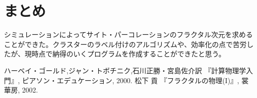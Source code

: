\documentclass{jsarticle}
\begin{document}
\begin{enumerate}
\begin{enumerate}
\begin{figure}[H]
                    \end{figure}
                    
                \end{enumerate}

        \end{enumerate}
    
    \section{まとめ}
        
        シミュレーションによってサイト・パーコレーションのフラクタル次元を求めることができた。クラスターのラベル付けのアルゴリズムや、効率化の点で苦労したが、現時点で納得のいくプログラムを作成することができたと思う。
        
    \begin{thebibliography}{99}
        ハーベイ・ゴールド,ジャン・トボチニク,石川正勝・宮島佐介訳
        \newblock 『計算物理学入門』, ピアソン・エデュケーション, 2000.
        松下 貢
        \newblock 『フラクタルの物理(I)』, 裳華房, 2002.  
    \end{thebibliography}     
\end{document}
